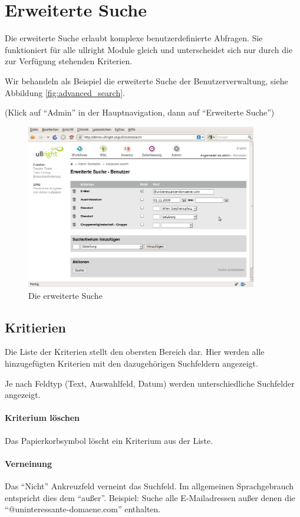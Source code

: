 \documentclass[article, a4paper, oneside, 11pt]{memoir}
\begin{document}
\section{Erweiterte Suche}
Die erweiterte Suche erlaubt komplexe benutzerdefinierte Abfragen. Sie funktioniert für alle ullright Module gleich und unterscheidet sich nur durch die zur Verfügung stehenden Kriterien.

Wir behandeln als Beispiel die erweiterte Suche der Benutzerverwaltung, siehe Abbildung \vref{fig:advanced_search}.

(Klick auf "`Admin"' in der Hauptnavigation, dann auf "`Erweiterte Suche"')


\begin{figure}[htp]
\centering
\includegraphics[width=0.9\textwidth]{figures/ullrightgermanexport-img5.png}
\caption{Die erweiterte Suche}
\label{fig:advanced_search}
\end{figure}


\subsection{Kritierien}
Die Liste der Kriterien stellt den obersten Bereich dar. Hier werden alle hinzugefügten Kriterien mit den dazugehörigen Suchfeldern angezeigt.

Je nach Feldtyp (Text, Auswahlfeld, Datum) werden unterschiedliche Suchfelder angezeigt.

\paragraph{Kriterium löschen}
Das Papierkorbsymbol löscht ein Kriterium aus der Liste.

\paragraph{Verneinung}
Das "`Nicht"' Ankreuzfeld verneint das Suchfeld. Im allgemeinen Sprachgebrauch entspricht dies dem "`außer"'. Beispiel: Suche alle E-Mailadressen außer denen die "`@uninteressante-domaene.com"' enthalten.
\end{document}
